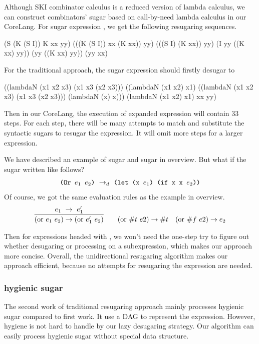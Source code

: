 Although SKI combinator calculus is a reduced version of lambda calculus, we can construct combinators' sugar based on call-by-need lambda calculus in our CoreLang. For sugar expression , we get the following resugaring sequences.
\begin{Codes}
    (S (K (S I)) K xx yy)
\OneStep (((K (S I)) xx (K xx)) yy)
\OneStep (((S I) (K xx)) yy)
\OneStep (I yy ((K xx) yy))
\OneStep (yy ((K xx) yy))
\OneStep (yy xx)
\end{Codes}


For the traditional approach, the sugar expression should firstly desugar to
\begin{Codes}
((lambdaN
   (x1 x2 x3)
   (x1 x3 (x2 x3)))
  ((lambdaN (x1 x2) x1)
   ((lambdaN
     (x1 x2 x3)
     (x1 x3 (x2 x3)))
    (lambdaN (x) x)))
  (lambdaN (x1 x2) x1)
  xx yy)
\end{Codes}

Then in our CoreLang, the execution of expanded expression will contain 33 steps. For each step, there will be many attempts to match and substitute the syntactic sugars to resugar the expression. It will omit more steps for a larger expression.

We have described an example of  sugar and  sugar in overview. But what if the  sugar written like follows?
\[\texttt{(Or $e_1$ $e_2$)} ~\rightarrow_d~ \texttt{(let (x $e_1$) (if x x $e_2$))}\]
Of course, we got the same evaluation rules as the example in overview.
\[
\begin{array}{c}
\infer {(\mbox{or}~e_1~e_2) \rightarrow (\mbox{or}~e_1'~e_2)} {e_1~ \rightarrow~e_1'}
\qquad
(\mbox{or}~\#t~e2) \rightarrow \#t
\quad
(\mbox{or}~\#f~e2) \rightarrow e_2 \\
\end{array}
\]

Then for expressions headed with , we won't need the one-step try to figure out whether desugaring or processing on a subexpression, which makes our approach more concise. Overall, the unidirectional resugaring algorithm makes our approach efficient, because no attempts for resugaring the expression are needed.
\subsubsection{hygienic sugar}
\label{mark:hygienic}


The second work\cite{hygienic} of traditional resugaring approach mainly processes hygienic sugar compared to first work. It use a DAG to represent the expression. However, hygiene is not hard to handle by our lazy desugaring strategy. Our algorithm can easily process hygienic sugar without special data structure.


